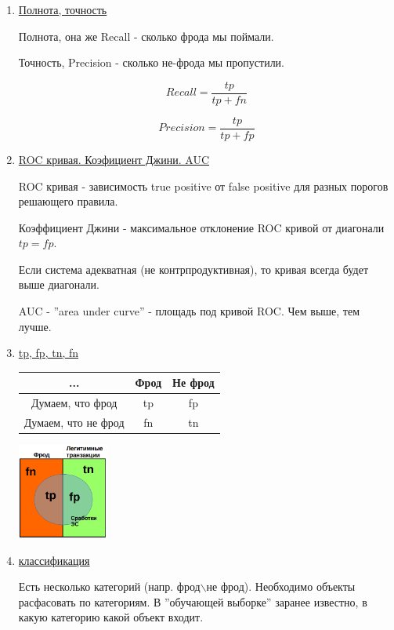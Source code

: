 \documentclass{proc}
\begin{document}
	
	\begin{enumerate}
		
		\item \uline{Полнота, точность}
		
		Полнота, она же Recall - сколько фрода мы поймали.
		
		Точность, Precision - сколько не-фрода мы пропустили.
		
		$$Recall = \frac{tp}{tp+fn}$$
		
		$$Precision = \frac{tp}{tp+fp}$$
		
		\item \uline{ROC кривая. Коэфициент Джини.  AUC}
		
		ROC кривая - зависимость true positive от false positive для разных порогов решающего правила.
		
		Коэффициент Джини - максимальное отклонение ROC кривой от диагонали $tp = fp$.
		
		Если система адекватная (не контрпродуктивная), то кривая всегда будет выше диагонали.
		
		AUC - ''area under curve'' - площадь под кривой ROC. Чем выше, тем лучше.
		
		\item \uline{tp, fp, tn, fn}
		
		\begin{center}
			\begin{tabular}{| c | c | c |}
				\hline
				... & Фрод & Не фрод \\ \hline
				Думаем, что фрод & tp & fp \\ \hline
				Думаем, что не фрод & fn & tn \\ \hline
			\end{tabular}
			
			\includegraphics[width=3cm]{tptnfpfn}
		\end{center}
		
		
		\item \uline{классификация}
		
		Есть несколько категорий (напр. фрод$\backslash$не фрод). Необходимо объекты расфасовать по категориям. В ''обучающей выборке'' заранее известно, в какую категорию какой объект входит. 
		

\end{enumerate}
\end{document}
